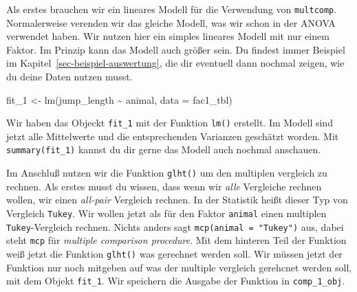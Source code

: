 \documentclass[
  letterpaper,
  DIV=11,
  oneside]{scrreport}
\newenvironment{Shaded}{\begin{snugshade}}{\end{snugshade}}
\newcommand{\AttributeTok}[1]{\textcolor[rgb]{0.40,0.45,0.13}{#1}}
\newcommand{\FunctionTok}[1]{\textcolor[rgb]{0.28,0.35,0.67}{#1}}
\newcommand{\NormalTok}[1]{\textcolor[rgb]{0.00,0.23,0.31}{#1}}
\newcommand{\OtherTok}[1]{\textcolor[rgb]{0.00,0.23,0.31}{#1}}
\newcommand{\SpecialCharTok}[1]{\textcolor[rgb]{0.37,0.37,0.37}{#1}}
\begin{document}

Als erstes brauchen wir ein lineares Modell für die Verwendung von
\texttt{multcomp}. Normalerweise verenden wir das gleiche Modell, was
wir schon in der ANOVA verwendet haben. Wir nutzen hier ein simples
lineares Modell mit nur einem Faktor. Im Prinzip kann das Modell auch
größer sein. Du findest immer Beispiel im
Kapitel~\ref{sec-beispiel-auswertung}, die dir eventuell dann nochmal
zeigen, wie du deine Daten nutzen musst.

\begin{Shaded}
\begin{Highlighting}[]
\NormalTok{fit\_1 }\OtherTok{\textless{}{-}} \FunctionTok{lm}\NormalTok{(jump\_length }\SpecialCharTok{\textasciitilde{}}\NormalTok{ animal, }\AttributeTok{data =}\NormalTok{ fac1\_tbl)}
\end{Highlighting}
\end{Shaded}

Wir haben das Objeckt \texttt{fit\_1} mit der Funktion \texttt{lm()}
erstellt. Im Modell sind jetzt alle Mittelwerte und die entsprechenden
Varianzen geschätzt worden. Mit \texttt{summary(fit\_1)} kannst du dir
gerne das Modell auch nochmal anschauen.


Im Anschluß nutzen wir die Funktion \texttt{glht()} um den multiplen
vergleich zu rechnen. Als erstes musst du wissen, dass wenn wir
\emph{alle} Vergleiche rechnen wollen, wir einen \emph{all-pair}
Vergleich rechnen. In der Statistik heißt dieser Typ von Vergleich
\texttt{Tukey}. Wir wollen jetzt als für den Faktor \texttt{animal}
einen multiplen \texttt{Tukey}-Vergleich rechnen. Nichts anders sagt
\texttt{mcp(animal\ =\ "Tukey")} aus, dabei steht \texttt{mcp} für
\emph{multiple comparison procedure}. Mit dem hinteren Teil der Funktion
weiß jetzt die Funktion \texttt{glht()} was gerechnet werden soll. Wir
müssen jetzt der Funktion nur noch mitgeben auf was der multiple
vergleich gerehcnet werden soll, mit dem Objekt \texttt{fit\_1}. Wir
speichern die Ausgabe der Funktion in \texttt{comp\_1\_obj}.
\end{document}

